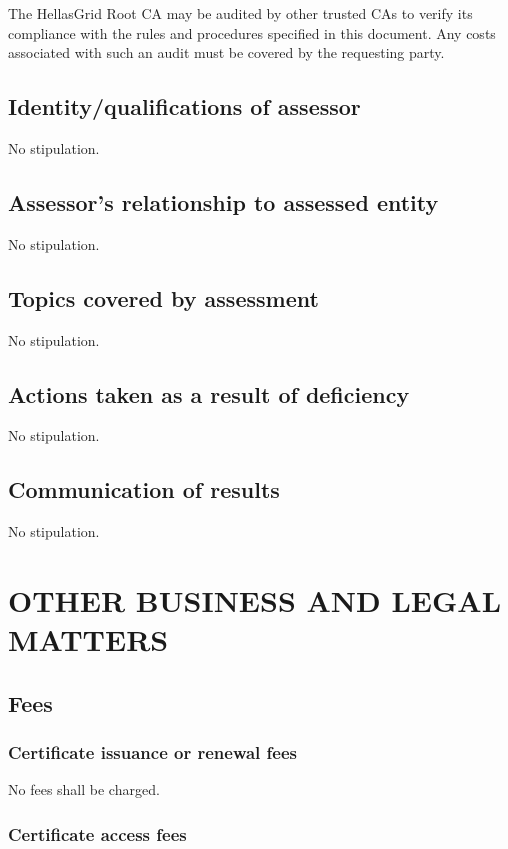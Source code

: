 \documentclass[11pt,a4paper,titlepage]{book}
\begin{document}
The HellasGrid Root CA may be audited by other trusted CAs to verify its compliance with the rules and procedures specified in this document. Any costs associated with such an audit must be covered by the requesting party.

\section{Identity/qualifications of assessor}

No stipulation.

\section{Assessor's relationship to assessed entity}

No stipulation.

\section{Topics covered by assessment}

No stipulation.

\section{Actions taken as a result of deficiency}

No stipulation.

\section{Communication of results}

No stipulation.



\chapter{OTHER BUSINESS AND LEGAL MATTERS}

\section{Fees}
\subsection{Certificate issuance or renewal fees}

No fees shall be charged.

\subsection{Certificate access fees}
\end{document}
